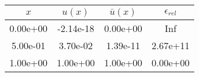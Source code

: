 \begin{tabular}{|c|c|c|c|}
\hline
\textbf{$x$}&\textbf{$u(x)$}&\textbf{$\bar{u}(x)$}&\textbf{$\epsilon_{rel}$}\\\hline
0.00e+00&-2.14e-18&0.00e+00&Inf\\\hline
5.00e-01&3.70e-02&1.39e-11&2.67e+11\\\hline
1.00e+00&1.00e+00&1.00e+00&0.00e+00\\\hline
\end{tabular}
